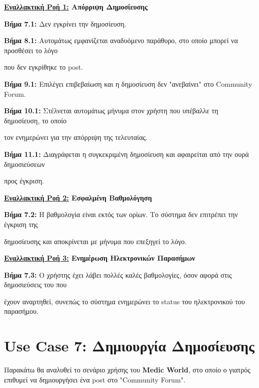 \documentclass{article}
\begin{document}
  \textbf{\underline{Εναλλακτική Ροή 1:} Απόρριψη Δημοσίευσης } \vspace{0.2cm}
\par \textbf{Βήμα 7.1:} Δεν εγκρίνει την δημοσίευση. \vspace{0.1cm}
\par \textbf{Βήμα 8.1:} Αυτομάτως εμφανίζεται αναδυόμενο παράθυρο, στο οποίο μπορεί να προσθέσει το λόγο \par που δεν εγκρίθηκε το post. \vspace{0.2cm}

\par \textbf{Βήμα 9.1:} Επιλέγει επιβεβαίωση και η δημοσίευση δεν "ανεβαίνει" στο Community Forum. \vspace{0.1cm}
\par \textbf{Βήμα 10.1:}  Στέλνεται αυτομάτως μήνυμα στον χρήστη που υπέβαλλε τη δημοσίευση, το οποίο \par τον ενημερώνει για την απόρριψη της τελευταίας. \vspace{0.1cm}
\par \textbf{Βήμα 11.1:}  Διαγράφεται η συγκεκριμένη δημοσίευση και αφαιρείται από την ουρά δημοσιεύσεων \par προς έγκριση. \vspace{0.2cm}

\textbf{\underline{Εναλλακτική Ροή 2:} Εσφαλμένη Βαθμολόγηση} \vspace{0.2cm}
\par \textbf{Βήμα 7.2:} Η βαθμολογία είναι εκτός των ορίων. Το σύστημα δεν επιτρέπει την έγκριση της \par δημοσίευσης και αποκρίνεται με μήνυμα που επεξηγεί το λόγο. \vspace{0.2cm}

\textbf{\underline{Εναλλακτική Ροή 3:} Ενημέρωση Ηλεκτρονικών Παρασήμων} \vspace{0.2cm}
\par \textbf{Βήμα 7.3:} Ο χρήστης έχει λάβει πολλές καλές βαθμολογίες, όσον αφορά στις δημοσιεύσεις του που \par έχουν αναρτηθεί, συνεπώς το σύστημα ενημερώνει το status του ηλεκτρονικού του παρασήμου.

\section{Use Case 7: Δημιουργία Δημοσίευσης}

Παρακάτω θα αναλυθεί το σενάριο χρήσης του \textbf{Medic World}, στο οποίο ο γιατρός επιθυμεί να δημιουργήσει ένα post στο "Community Forum".
\end{document}
